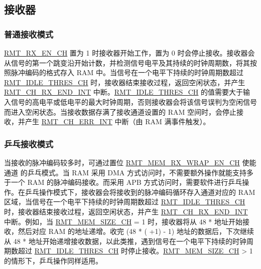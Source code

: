 \documentclass[main\_\_CN.tex]{subfiles}
\begin{document}
\subsection{接收器}

\subsubsection{普通接收模式}\label{sec:normal-rx-mode}

\hyperref[fielddesc:RMTRXENCHM]{RMT\_RX\_EN\_CH} 置为 1 时接收器开始工作，置为 0 时会停止接收。接收器会从信号的第一个跳变沿开始计数，并检测信号电平及其持续的时钟周期数，将其按照脉冲编码的格式存入 RAM 中。当信号在一个电平下持续的时钟周期数超过 \hyperref[fielddesc:RMTIDLETHRESCHM]{RMT\_IDLE\_THRES\_CH} 时，接收器结束接收过程，返回空闲状态，并产生 \hyperref[int:RMTCHnRXENDINT]{RMT\_CH\_RX\_END\_INT} 中断。\hyperref[fielddesc:RMTIDLETHRESCHM]{RMT\_IDLE\_THRES\_CH} 的值需要大于输入信号的高电平或低电平的最大时钟周期，否则接收器会将该信号误判为空闲信号而进入空闲状态。当接收数据存满了接收通道设置的 RAM 空间时，会停止接收，并产生 \hyperref[int:RMTCHnERRINT]{RMT\_CH\_ERR\_INT} 中断（由 RAM 满事件触发）。



\subsubsection{乒乓接收模式}

当接收的脉冲编码较多时，可通过置位 \hyperref[fielddesc:RMTMEMRXWRAPENCHM]{RMT\_MEM\_RX\_WRAP\_EN\_CH} 使能通道  的乒乓模式。当 RAM 采用 DMA 方式访问时，不需要额外操作就能支持多于一个 RAM 的脉冲编码接收。而采用 APB 方式访问时，需要软件进行乒乓操作。在乒乓操作模式下，接收器会将接收到的脉冲编码循环存入通道对应的 RAM 区域，当信号在一个电平下持续的时钟周期数超过 \hyperref[fielddesc:RMTIDLETHRESCHM]{RMT\_IDLE\_THRES\_CH} 时，接收器结束接收过程，返回空闲状态，并产生 \hyperref[int:RMTCHnRXENDINT]{RMT\_CH\_RX\_END\_INT} 中断。例如，当 \hyperref[fielddesc:RMTMEMSIZECHM]{RMT\_MEM\_SIZE\_CH} = 1 时，接收器将从 48 *  地址开始接收，然后对应 RAM 的地址递增。收完 (48 * ( +1) - 1) 地址的数据后，下次继续从 48 *  地址开始递增接收数据，以此类推，遇到信号在一个电平下持续的时钟周期数超过 \hyperref[fielddesc:RMTIDLETHRESCHM]{RMT\_IDLE\_THRES\_CH} 时停止接收。\hyperref[fielddesc:RMTMEMSIZECHM]{RMT\_MEM\_SIZE\_CH} > 1 的情形下，乒乓操作同样适用。
\end{document}
